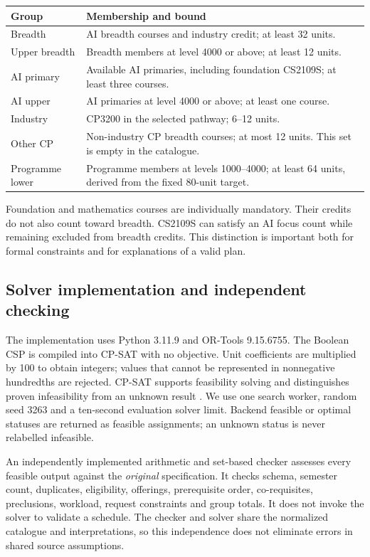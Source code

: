 \documentclass[11pt,a4paper]{article}
\begin{document}
\begin{center}
\begin{minipage}{\linewidth}
\label{tab:groups}
\begin{tabularx}{\linewidth}{@{}lY@{}}
\toprule
Group & Membership and bound\\
\midrule
Breadth & AI breadth courses and industry credit; at least 32 units.\\
Upper breadth & Breadth members at level 4000 or above; at least 12 units.\\
AI primary & Available AI primaries, including foundation CS2109S; at least three courses.\\
AI upper & AI primaries at level 4000 or above; at least one course.\\
Industry & CP3200 in the selected pathway; 6--12 units.\\
Other CP & Non-industry CP breadth courses; at most 12 units. This set is empty in the catalogue.\\
Programme lower & Programme members at levels 1000--4000; at least 64 units, derived from the fixed 80-unit target.\\
\bottomrule
\end{tabularx}
\end{minipage}
\end{center}
Foundation and mathematics courses are individually mandatory. Their credits
do not also count toward breadth. CS2109S can satisfy an AI focus count while
remaining excluded from breadth credits. This distinction is important both
for formal constraints and for explanations of a valid plan.

\subsection{Solver implementation and independent checking}
The implementation uses Python 3.11.9 and OR-Tools 9.15.6755. The Boolean
CSP is compiled into CP-SAT with no objective. Unit coefficients are multiplied
by 100 to obtain integers; values that cannot be represented in nonnegative
hundredths are rejected. CP-SAT supports feasibility solving and distinguishes
proven infeasibility from an unknown result \cite{cpsat}. We use one search
worker, random seed 3263 and a ten-second evaluation solver limit.
Backend feasible or optimal statuses are returned as feasible assignments;
an unknown status is never relabelled infeasible.

An independently implemented arithmetic and set-based checker assesses every
feasible output against the \emph{original} specification. It checks schema,
semester count, duplicates, eligibility, offerings, prerequisite order,
co-requisites, preclusions, workload, request constraints and group totals.
It does not invoke the solver to validate a schedule. The checker and solver
share the normalized catalogue and interpretations, so this independence
does not eliminate errors in shared source assumptions.
\end{document}
